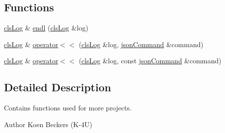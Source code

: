 \subsection*{Functions}
\begin{DoxyCompactItemize}
\item 
\hyperlink{class_k4_u_1_1cls_log}{cls\-Log} \& \hyperlink{namespace_k4_u_aaddaee50fab2801df390147891b0c09d}{endl} (\hyperlink{class_k4_u_1_1cls_log}{cls\-Log} \&log)
\item 
\hyperlink{class_k4_u_1_1cls_log}{cls\-Log} \& \hyperlink{namespace_k4_u_ac6dc12e99e9f8aac74f9b654ddbb199a}{operator$<$$<$} (\hyperlink{class_k4_u_1_1cls_log}{cls\-Log} \&log, \hyperlink{class_k4_u_1_1json_command}{json\-Command} \&command)
\item 
\hyperlink{class_k4_u_1_1cls_log}{cls\-Log} \& \hyperlink{namespace_k4_u_a0c716ceb468c5d67c805ba246f06c79d}{operator$<$$<$} (\hyperlink{class_k4_u_1_1cls_log}{cls\-Log} \&log, const \hyperlink{class_k4_u_1_1json_command}{json\-Command} \&command)
\end{DoxyCompactItemize}


\subsection{Detailed Description}
Contains functions used for more projects. \begin{DoxyAuthor}{Author}
Koen Beckers (K-\/4\-U) 
\end{DoxyAuthor}


